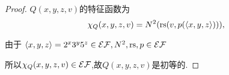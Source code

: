 \begin{proof}
    $Q(x,y,z,v)$的特征函数为
    $$\chi_Q(x,y,z,v)=N^2(\mathrm{rs}(v,p(\langle x,y,z \rangle))),$$
	
    由于
    $\langle x,y,z \rangle=2^x3^y5^z\in\mathcal{EF},N^2,\mathrm{rs},p\in\mathcal{EF}$
    
    所以$\chi_Q(x,y,z,v)\in\mathcal{EF}$,故$Q(x,y,z,v)$是初等的.
\end{proof}